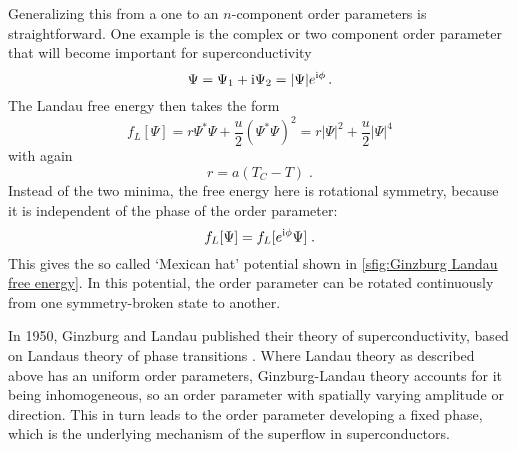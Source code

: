 \documentclass[../notes.tex]{subfiles}
\begin{document}
Generalizing this from a one to an \(n\)-component order parameters is straightforward.
One example is the complex or two component order parameter that will become important for superconductivity
\begin{equation}
	\Psi = \Psi_1 + \mathrm{i} \Psi_2 = \vert \Psi \vert e^{\mathrm{i} \phi} \,.
\end{equation}
The Landau free energy then takes the form
\begin{equation}
	f_L [\Psi] = r \Psi^* \Psi + \frac{u}{2} (\Psi^* \Psi)^2 = r \vert \Psi \vert^2 + \frac{u}{2} \vert \Psi \vert^4
\end{equation}
with again
\begin{equation}
	r = a(T_C - T) \;.
\end{equation}
Instead of the two minima, the free energy here is rotational symmetry, because it is independent of the phase of the order parameter: 
\begin{equation}
	f_L [\Psi] = f_L [e^{\mathrm{i} \phi} \Psi] \;.
\end{equation}
This gives the so called `Mexican hat' potential shown in \cref{sfig:Ginzburg Landau free energy}.
In this potential, the order parameter can be rotated continuously from one symmetry-broken state to another.

In 1950, Ginzburg and Landau published their theory of superconductivity, based on Landaus theory of phase transitions \cite{ginzburgTheorySuperconductivity1950}.
Where Landau theory as described above has an uniform order parameters, Ginzburg-Landau theory accounts for it being inhomogeneous, so an order parameter with spatially varying amplitude or direction.
This in turn leads to the order parameter developing a fixed phase, which is the underlying mechanism of the superflow in superconductors.
\end{document}
